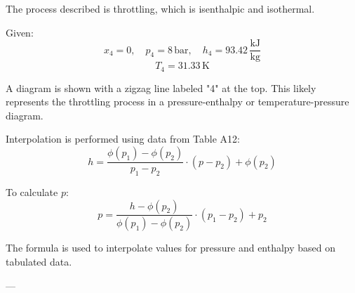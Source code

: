 The process described is throttling, which is isenthalpic and isothermal.  

Given:  
\[
x_4 = 0, \quad p_4 = 8 \, \text{bar}, \quad h_4 = 93.42 \, \frac{\text{kJ}}{\text{kg}}
\]  
\[
T_4 = 31.33 \, \text{K}
\]  

A diagram is shown with a zigzag line labeled "4" at the top. This likely represents the throttling process in a pressure-enthalpy or temperature-pressure diagram.  

Interpolation is performed using data from Table A12:  
\[
h = \frac{\phi(p_1) - \phi(p_2)}{p_1 - p_2} \cdot (p - p_2) + \phi(p_2)
\]  

To calculate \( p \):  
\[
p = \frac{h - \phi(p_2)}{\phi(p_1) - \phi(p_2)} \cdot (p_1 - p_2) + p_2
\]  

The formula is used to interpolate values for pressure and enthalpy based on tabulated data.  

---